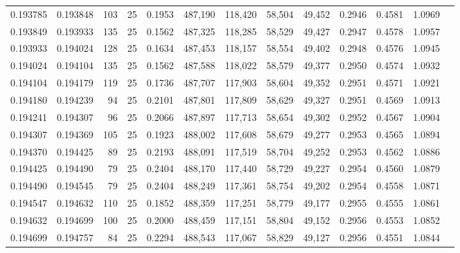 \begin{tabular}{rrrrrrrrrrrrr}
0.193785 & 0.193848 &   103 &  25 &                                     0.1953 & 487,190 & 118,420 &  58,504 &  49,452 & 0.2946 & 0.4581 & 1.0969 \\
0.193849 & 0.193933 &   135 &  25 &                                     0.1562 & 487,325 & 118,285 &  58,529 &  49,427 & 0.2947 & 0.4578 & 1.0957 \\
0.193933 & 0.194024 &   128 &  25 &                                     0.1634 & 487,453 & 118,157 &  58,554 &  49,402 & 0.2948 & 0.4576 & 1.0945 \\
0.194024 & 0.194104 &   135 &  25 &                                     0.1562 & 487,588 & 118,022 &  58,579 &  49,377 & 0.2950 & 0.4574 & 1.0932 \\
0.194104 & 0.194179 &   119 &  25 &                                     0.1736 & 487,707 & 117,903 &  58,604 &  49,352 & 0.2951 & 0.4571 & 1.0921 \\
0.194180 & 0.194239 &    94 &  25 &                                     0.2101 & 487,801 & 117,809 &  58,629 &  49,327 & 0.2951 & 0.4569 & 1.0913 \\
0.194241 & 0.194307 &    96 &  25 &                                     0.2066 & 487,897 & 117,713 &  58,654 &  49,302 & 0.2952 & 0.4567 & 1.0904 \\
0.194307 & 0.194369 &   105 &  25 &                                     0.1923 & 488,002 & 117,608 &  58,679 &  49,277 & 0.2953 & 0.4565 & 1.0894 \\
0.194370 & 0.194425 &    89 &  25 &                                     0.2193 & 488,091 & 117,519 &  58,704 &  49,252 & 0.2953 & 0.4562 & 1.0886 \\
0.194425 & 0.194490 &    79 &  25 &                                     0.2404 & 488,170 & 117,440 &  58,729 &  49,227 & 0.2954 & 0.4560 & 1.0879 \\
0.194490 & 0.194545 &    79 &  25 &                                     0.2404 & 488,249 & 117,361 &  58,754 &  49,202 & 0.2954 & 0.4558 & 1.0871 \\
0.194547 & 0.194632 &   110 &  25 &                                     0.1852 & 488,359 & 117,251 &  58,779 &  49,177 & 0.2955 & 0.4555 & 1.0861 \\
0.194632 & 0.194699 &   100 &  25 &                                     0.2000 & 488,459 & 117,151 &  58,804 &  49,152 & 0.2956 & 0.4553 & 1.0852 \\
0.194699 & 0.194757 &    84 &  25 &                                     0.2294 & 488,543 & 117,067 &  58,829 &  49,127 & 0.2956 & 0.4551 & 1.0844 \\

\end{tabular}
